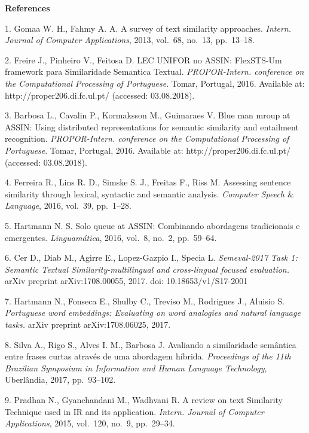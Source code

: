 
{\small

\vskip4mm%

\noindent \textbf{References} }

\vskip 1.5mm%

{\footnotesize

1. Gomaa W. H., Fahmy A. A. A survey of text similarity
approaches. {\it Intern. Journal of Computer Applications}, 2013,
vol.~68, no.~13, pp.~13--18.

2. Freire J., Pinheiro V., Feitosa D. LEC UNIFOR no ASSIN:
FlexSTS-Um framework para Similaridade Semantica Textual. {\it
PROPOR-Intern. conference on the Computational Processing of
Portuguese}. Tomar, Portugal, 2016. Available at:
http://proper206.di.fc.ul.pt/ (accessed: 03.08.2018).

3. Barbosa L., Cavalin P., Kormaksson M., Guimaraes V. Blue man
mroup at ASSIN: Using distributed representations for semantic
similarity and entailment recognition. {\it PROPOR-Intern.
conference on the Computational Processing of Portuguese}. Tomar,
Portugal, 2016. Available at: http://proper206.di.fc.ul.pt/
(accessed: 03.08.2018).

4. Ferreira R., Lins R. D., Simske S. J., Freitas F., Riss M.
Assessing sentence similarity through lexical, syntactic and
semantic analysis. {\it Computer Speech $\&$ Language}, 2016,
vol.~39, pp.~1--28.

5. Hartmann N. S. Solo queue at ASSIN: Combinando abordagens
tradicionais e emergentes. {\it Linguam{\'a}tica}, 2016, vol.~8,
no.~2, pp.~59--64.\newpage

6. Cer D., Diab M., Agirre E., Lopez-Gazpio I., Specia L. {\it
Semeval-2017 Task 1: Semantic Textual Similarity-multilingual and
cross-lingual focused evaluation.} arXiv preprint
arXiv:1708.00055, 2017. doi: 10.18653/v1/S17-2001

7. Hartmann N., Fonseca E., Shulby C., Treviso M., Rodrigues J.,
Aluisio S. {\it Portuguese word embeddings: Evaluating on word
analogies and natural language tasks.} arXiv preprint
arXiv:1708.06025, 2017.

8. Silva A., Rigo S., Alves I. M., Barbosa J. Avaliando a
similaridade sem{\^{a}}ntica entre frases curtas atrav{\'{e}}s de
uma abordagem h{\'{i}}brida. {\it Proceedings of the 11th
Brazilian Symposium in Information and Human Language Technology},
Uberl{\^{a}}ndia, 2017, pp.~93--102.

9. Pradhan N., Gyanchandani M., Wadhvani R. A review on text
Similarity Technique used in IR and its application. {\it Intern.
Journal of Computer Applications}, 2015, vol.~120, no.~9,
pp.~29--34.

}
